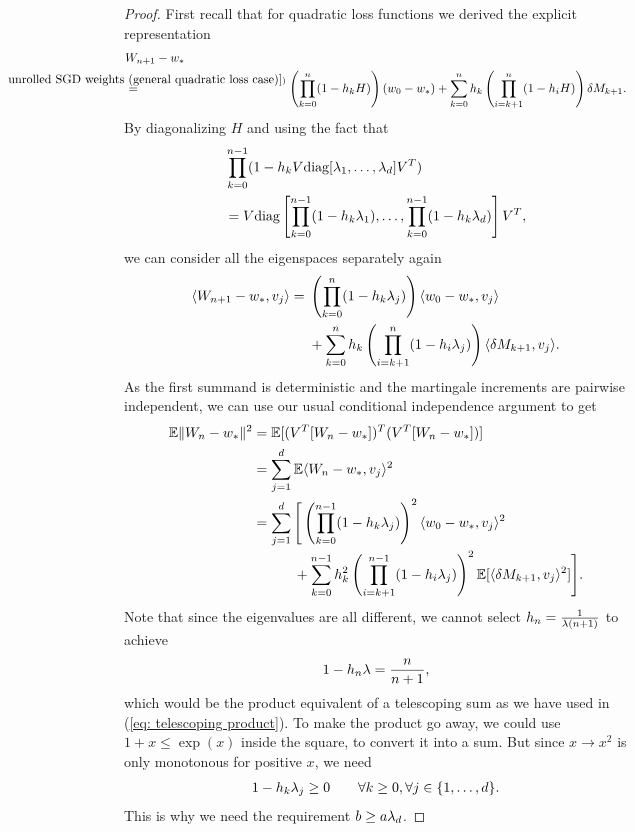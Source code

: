 \begin{proof}
	First recall that for quadratic loss functions we derived the explicit
	representation
	\begin{align*}
	&\Weights_{n+1}-\minimum\\
	&\lxeq{(\ref{eq: unrolled SGD weights (general quadratic loss case)})}
	\left(\prod_{k=0}^n(1-\lr_kH)\right)(\weights_0-\minimum)
	+ \sum_{k=0}^n\lr_k\left(\prod_{i=k+1}^n(1-\lr_iH)\right)\martIncr_{k+1}.
	\end{align*}
	By diagonalizing \(H\) and using the fact that
	\begin{align*}
		&\prod_{k=0}^{n-1} (1-h_k V\text{diag}[\lambda_1, \dots, \lambda_d]V^T)\\
		&= V \text{diag}\left[
			\prod_{k=0}^{n-1}(1-h_k\lambda_1),
			\dots, \prod_{k=0}^{n-1}(1-h_k\lambda_d)
		\right]V^T,
	\end{align*}
	we can consider all the eigenspaces separately again
	\begin{align*}
		\langle W_{n+1}-w_*, v_j \rangle
		= \begin{aligned}[t]
			&\left(\prod_{k=0}^n(1-h_k\lambda_j)\right) \langle w_0-w_*, v_j\rangle\\
			&+ \sum_{k=0}^n h_k \left(\prod_{i=k+1}^n(1-h_i\lambda_j)\right)\langle\delta M_{k+1},v_j\rangle.
		\end{aligned}
	\end{align*}
	As the first summand is deterministic and the martingale increments are
	pairwise independent, we can use our usual conditional independence argument
	to get
	\begin{align*}
		\mathbb{E}\|W_n-w_*\|^2
		&= \mathbb{E}[(V^T [W_n-w_*])^T(V^T[W_n-w_*])]\\
		&= \sum_{j=1}^d \mathbb{E}\langle W_n-w_*, v_j \rangle^2\\
		&= \sum_{j=1}^d
		\begin{aligned}[t]
			&\Bigg[\left(\prod_{k=0}^{n-1}(1-h_k\lambda_j)\right)^2 \langle w_0-w_*, v_j\rangle^2\\
			&+ \sum_{k=0}^{n-1} h_k^2 \left(\prod_{i=k+1}^{n-1}(1-h_i\lambda_j)\right)^2\mathbb{E}[\langle\delta M_{k+1},v_j\rangle^2]\Bigg].
		\end{aligned}
	\end{align*}
	Note that since the eigenvalues are all different, we cannot select \(h_n=\frac{1}{\lambda(n+1)}\)
	to achieve
	\begin{align*}
		1-h_n\lambda = \frac{n}{n+1},
	\end{align*}
	which would be the product equivalent of a telescoping sum as we have used in
	(\ref{eq: telescoping product}). To make the product go away, we could use
	\(1+x\le \exp(x)\) inside the square, to convert it into a sum. But since \(x\to
	x^2\) is only monotonous for positive \(x\), we need
	\begin{align*}
		1-h_k \lambda_j \ge 0 \qquad \forall k\ge 0, \forall j \in\{1,\dots,d\}.
	\end{align*}
	This is why we need the requirement \(b\ge a\lambda_d\).


\end{proof}
